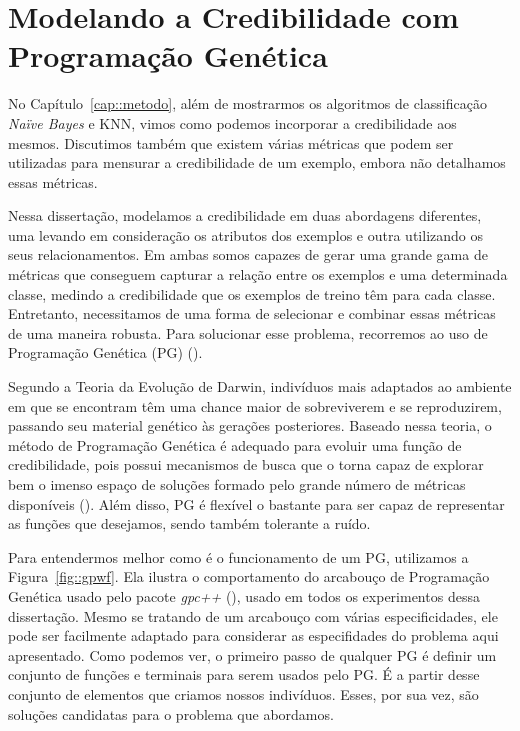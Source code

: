 
\chapter{Modelando a Credibilidade com Programação Genética}
\label{cap::programacao_genetica}

No Capítulo~\ref{cap::metodo},
além de mostrarmos os algoritmos de classificação \textit{Naïve Bayes} e \textsc{KNN}, vimos como podemos incorporar a credibilidade aos mesmos.
Discutimos também que existem várias métricas que podem ser utilizadas para mensurar a credibilidade de um exemplo,
embora não detalhamos essas métricas.

Nessa dissertação, modelamos a credibilidade em duas abordagens diferentes, uma levando em consideração os atributos dos exemplos e outra utilizando os seus relacionamentos.
Em ambas somos capazes de gerar uma grande gama de métricas que conseguem capturar a relação entre os exemplos e uma determinada classe, medindo a credibilidade que os exemplos de treino têm para cada classe.
Entretanto, necessitamos de uma forma de selecionar e combinar essas métricas de uma maneira robusta. Para solucionar esse problema, recorremos ao uso de Programação Genética (\textsc{PG}) (\cite{Koza92}).

Segundo a Teoria da Evolução de Darwin, indivíduos mais adaptados ao ambiente em que se encontram têm uma chance maior de sobreviverem e se reproduzirem, passando seu material genético às gerações posteriores. Baseado nessa teoria, o método de Programação Genética é adequado para evoluir uma função de credibilidade, pois possui mecanismos de busca que o torna capaz de explorar bem o imenso espaço de soluções formado pelo grande número de métricas disponíveis (\cite{Fogel00}). Além disso, \textsc{PG} é flexível o bastante para ser capaz de representar as funções que desejamos, sendo também tolerante a ruído.

Para entendermos melhor como é o funcionamento de um \textsc{PG}, utilizamos a Figura~\ref{fig::gpwf}. Ela ilustra o comportamento do arcabouço de Programação Genética usado pelo pacote \textit{gpc++} (\cite{gpcpp}), usado em todos os experimentos dessa dissertação. Mesmo se tratando de um arcabouço com várias especificidades, ele pode ser facilmente adaptado para considerar as especifidades do problema aqui apresentado.
Como podemos ver, o primeiro passo de qualquer \textsc{PG} é definir um conjunto de funções e terminais para serem usados pelo \textsc{PG}.
É a partir desse conjunto de elementos que criamos nossos indivíduos.
Esses, por sua vez, são soluções candidatas para o problema que abordamos.

